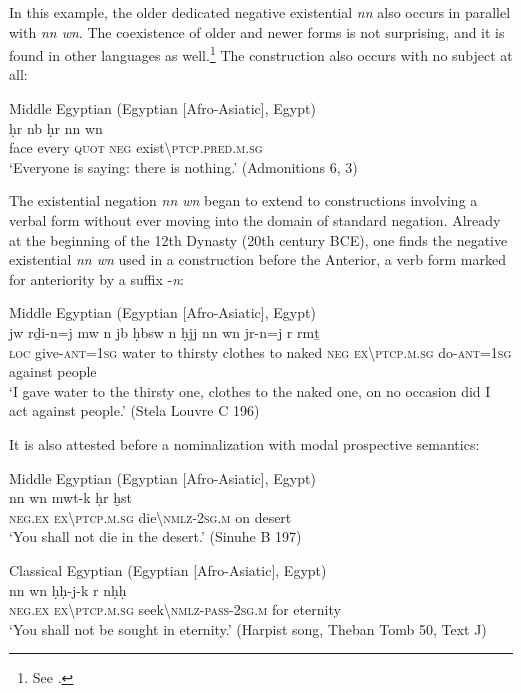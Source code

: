 \documentclass[output=paper,draft,draftmode,colorlinks,citecolor=brown]{langscibook}
\begin{document}
In this example, the older dedicated negative existential \textit{nn} also occurs in parallel with \textit{nn wn}. The coexistence of older and newer forms is not surprising, and it is found in other languages as well.\footnote{See \citet{Veselinova2014}.} 
The construction also occurs with no subject at all:  
 
\ea Middle Egyptian (Egyptian [Afro-Asiatic], Egypt) \label{ex:AE40}\\
    \gll ḥr nb ḥr nn wn\\
    face every \textsc{quot} \textsc{neg} exist\textbackslash\textsc{ptcp.pred.m.sg}\\ 
    \glt ‘Everyone is saying: there is nothing.’ (Admonitions 6, 3)
\z 
 
The existential negation \textit{nn wn} began to extend to constructions involving a verbal form without ever moving into the domain of standard negation. Already at the beginning of the 12th Dynasty (20th century BCE), one finds the negative existential \textit{nn wn} used in a construction before the Anterior, a verb form marked for anteriority by a suffix -\textit{n}:  
 
\ea Middle Egyptian (Egyptian [Afro-Asiatic], Egypt) \label{ex:AE41}\\
    \gll jw rḏi-n=j mw n jb ḥbsw n ḥ{\ꜣ}jj nn wn jr-n=j r rmṯ\\
    \textsc{loc} give-\textsc{ant=1sg} water to thirsty clothes to naked \textsc{neg} \textsc{ex}\textbackslash\textsc{ptcp.m.sg} do-\textsc{ant=1sg} against people\\ 
    \glt ‘I gave water to the thirsty one, clothes to the naked one, on no occasion did I act against people.’ (Stela Louvre C 196) 
\z 
 
It is also attested before a nominalization with modal prospective semantics: 
 
\ea Middle Egyptian (Egyptian [Afro-Asiatic], Egypt) \label{ex:AE42}\\
    \gll nn wn mwt-k ḥr ḫ{\ꜣ}st\\
    \textsc{neg.ex} \textsc{ex}\textbackslash\textsc{ptcp.m.sg} die\textbackslash\textsc{nmlz-2sg.m} on desert\\ 
    \glt ‘You shall not die in the desert.’ (Sinuhe B 197) 
\z 

\ea Classical Egyptian (Egyptian [Afro-Asiatic], Egypt) \label{ex:AE43}\\
    \gll nn wn ḥḥ-j-k r nḥḥ\\
    \textsc{neg.ex} \textsc{ex}\textbackslash\textsc{ptcp.m.sg} seek\textbackslash\textsc{nmlz-pass-2sg.m} for eternity\\ 
    \glt ‘You shall not be sought in eternity.’ (Harpist song, Theban Tomb 50, Text J)
\z 
 
\end{document}
